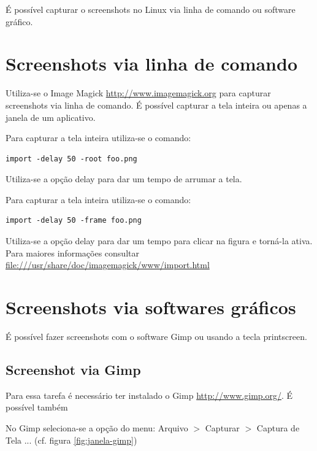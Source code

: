 \documentclass[12pt,brazil]{book}
\begin{document}
É possível capturar o screenshots no Linux via linha de comando ou
software gráfico.

\section{Screenshots via linha de comando}
\label{sec:scre-via-linha}

Utiliza-se o Image Magick \url{http://www.imagemagick.org} para
capturar screenshots via linha de comando. É possível capturar a tela
inteira ou apenas a janela de um aplicativo.

Para capturar a tela inteira utiliza-se o comando:

\begin{verbatim}
import -delay 50 -root foo.png
\end{verbatim}

Utiliza-se a opção delay para dar um tempo de arrumar a tela.

Para capturar a tela inteira utiliza-se o comando:

\begin{verbatim}
import -delay 50 -frame foo.png
\end{verbatim}

Utiliza-se a opção delay para dar um tempo para clicar na figura e
torná-la ativa. Para maiores informações consultar
\url{file:///usr/share/doc/imagemagick/www/import.html}

\section{Screenshots via softwares gráficos}
\label{sec:scre-via-softw}

É possível fazer screenshots com o software Gimp ou usando a tecla
printscreen.

\subsection{Screenshot via Gimp}
\label{sec:screenshot-via-gimp}

Para essa tarefa é necessário ter instalado o Gimp
\url{http://www.gimp.org/}. É possível também 

No Gimp seleciona-se a opção do menu: Arquivo $>$ Capturar $>$ Captura
de Tela ... (cf. figura \ref{fig:janela-gimp})
\end{document}

